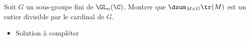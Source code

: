 \begin{enonce}
\begin{exercise}[ID={RMS134 E571},subtitle={Oral
    Mines-Ponts},theme={algebre},annee={2023},concours={mines-ponts},filiere={MP}]
Soit $G$ un sous-groupe fini de $\GL_n(\C)$. Montrer que $\dsum_{M\in
  G}\tr(M)$ est un entier divisible par le cardinal de $G$.
\end{exercise}
\begin{solution}
  \begin{itemize}
  \item Solution à compléter
  \end{itemize}
\end{solution}
\end{enonce}